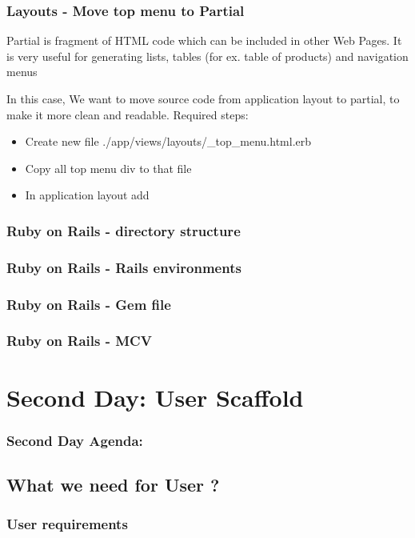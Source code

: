 \documentclass{beamer}
\theoremstyle{mystyle}
\begin{document}
\begin{frame}
  \frametitle{Layouts - Move top menu to Partial}
  \begin{definition}
    Partial is fragment of HTML code which can be included in other Web Pages.
    It is very useful for generating lists, tables (for ex. table of products)
    and navigation menus 
  \end{definition}
  In this case, We want to move source code from application layout to partial,
  to make it more clean and readable.
  Required steps:
  \begin{itemize}
    \item Create new file ./app/views/layouts/\_top\_menu.html.erb
    \item Copy all top menu div to that file
    \item In application layout add \railspartial
  \end{itemize}

\end{frame}

\begin{frame}
  \frametitle{Ruby on Rails - directory structure}
  
\end{frame}


\begin{frame}
  \frametitle{Ruby on Rails - Rails environments}
  
\end{frame}


\begin{frame}
  \frametitle{Ruby on Rails - Gem file}
  
\end{frame}

\begin{frame}
  \frametitle{Ruby on Rails - MCV}
  
\end{frame}

\section{Second Day: User Scaffold}
    \begin{frame}
      \frametitle{Second Day Agenda:}
      \tableofcontents
      [
      currentsection,
      sectionstyle=hide/hide,
      subsectionstyle=show/show/hide
      ]
    \end{frame}

  \subsection{What we need for User ?}
    \begin{frame}
      \frametitle{User requirements}
    \end{frame}
\end{document}

